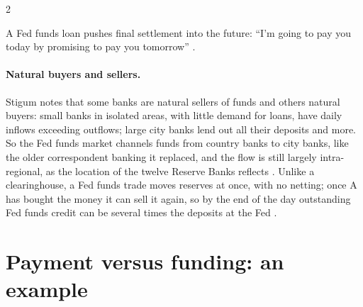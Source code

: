 \begin{paracol}{2}
\begin{proposition}
A Fed funds loan pushes final settlement into the future: ``I'm going to pay you today by promising to pay you tomorrow'' .
\end{proposition}

\paragraph{Natural buyers and sellers.} Stigum notes that some banks are natural sellers of funds and others natural buyers: small banks in isolated areas, with
little demand for loans, have daily inflows exceeding outflows; large city banks lend out all their deposits and more. So the Fed funds market channels funds from
country banks to city banks, like the older correspondent banking it replaced, and the flow is still largely intra-regional, as the location of the twelve Reserve
Banks reflects . Unlike a clearinghouse, a Fed funds trade moves reserves at once, with no netting; once A has bought the money it can sell it again, so by
the end of the day outstanding Fed funds credit can be several times the deposits at the Fed .

\section{Payment versus funding: an example}\label{sec:ff-example}


\end{paracol}
